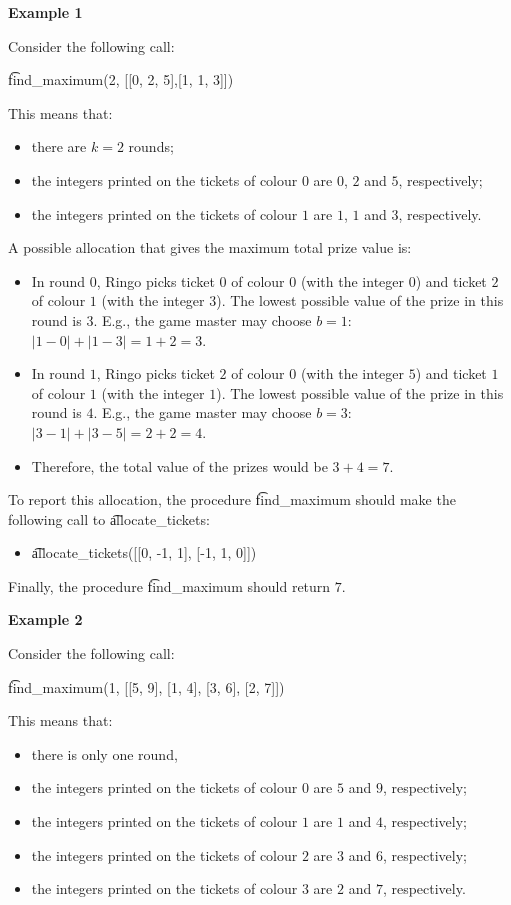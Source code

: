 \textbf{Example 1}

Consider the following call:

\t{find\_maximum(2, [[0, 2, 5],[1, 1, 3]])}

This means that:
\begin{itemize}
\item there are $k=2$ rounds;
\item the integers printed on the tickets of colour $0$ are $0$, $2$ and $5$, respectively;
\item the integers printed on the tickets of colour $1$ are $1$, $1$ and $3$, respectively.
\end{itemize}

A possible allocation that gives the maximum total prize value is:
\begin{itemize}
\item In round $0$, Ringo picks ticket $0$ of colour $0$ (with the integer $0$) and ticket $2$ of colour $1$ (with the integer $3$). The lowest possible value of the prize in this round is $3$. E.g., the game master may choose $b = 1$: $|1 - 0| + |1 - 3| = 1 + 2 = 3$.
\item In round $1$, Ringo picks ticket $2$ of colour $0$ (with the integer $5$) and ticket $1$ of colour $1$ (with the integer $1$). The lowest possible value of the prize in this round is $4$. E.g., the game master may choose $b = 3$: $|3 - 1| + |3 - 5| = 2 + 2 = 4$.
\item Therefore, the total value of the prizes would be $3 + 4 = 7$.
\end{itemize}

To report this allocation, the procedure \t{find\_maximum} should make the following call to \t{allocate\_tickets}:
\begin{itemize}
\item \t{allocate\_tickets([[0, -1, 1], [-1, 1, 0]])}
\end{itemize}

Finally, the procedure \t{find\_maximum} should return $7$.

\textbf{Example 2}

Consider the following call:

\t{find\_maximum(1, [[5, 9], [1, 4], [3, 6], [2, 7]])}

This means that:
\begin{itemize}
\item there is only one round,
\item the integers printed on the tickets of colour $0$ are $5$ and $9$, respectively;
\item the integers printed on the tickets of colour $1$ are $1$ and $4$, respectively;
\item the integers printed on the tickets of colour $2$ are $3$ and $6$, respectively;
\item the integers printed on the tickets of colour $3$ are $2$ and $7$, respectively.
\end{itemize}


